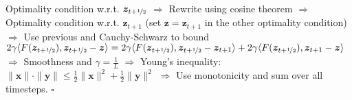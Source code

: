 \documentclass[8pt,a4paper]{extarticle}
\renewcommand{\proof}[1]{\begin{tcolorbox}#1 \hfill $\square$\end{tcolorbox}}
\renewcommand{\vec}[1]{\bm{#1}}
\newenvironment{topic}[1]
{\textbf{\sffamily \colorbox{black}{\rlap{\textbf{\textcolor{white}{#1}}}\hspace{\linewidth}\hspace{-2\fboxsep}}} \\ \vspace{0.2cm}}
{}
\begin{document}
\begin{multicols*}{2}
\begin{topic}{Variational inequalities}
\begin{itemize}
                  \proof{Optimality condition w.r.t. $\vec{z}_{t+\nicefrac{1}{2}}$ $\Rightarrow$ Rewrite using cosine theorem $\Rightarrow$ Optimality condition w.r.t. $\vec{z}_{t+1}$ (set $\vec{z} = \vec{z}_{t+1}$ in the other optimality condition) $\Rightarrow$ Use previous and Cauchy-Schwarz to bound $2 \gamma \langle F(\vec{z}_{t+\nicefrac{1}{2}}), \vec{z}_{t+\nicefrac{1}{2}} - \vec{z} \rangle = 2 \gamma \langle F(\vec{z}_{t+\nicefrac{1}{2}}), \vec{z}_{t+\nicefrac{1}{2}} - \vec{z}_{t+1} \rangle + 2 \gamma \langle F(\vec{z}_{t+\nicefrac{1}{2}}), \vec{z}_{t+1} - \vec{z} \rangle$ $\Rightarrow$ Smoothness and $\gamma = \frac{1}{L}$ $\Rightarrow$ Young's inequality: $\| \vec{x} \| \cdot \| \vec{y} \| \leq \frac{1}{2} \| \vec{x} \|^2 + \frac{1}{2} \| \vec{y} \|^2$ $\Rightarrow$ Use monotonicity and sum over all timesteps.}
        \end{itemize}
    \end{topic}
\end{multicols*}
\end{document}
